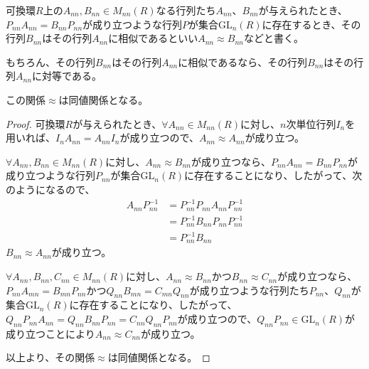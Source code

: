 \documentclass[dvipdfmx]{jsarticle}
\begin{document}
\begin{dfn}
可換環$R$上の$A_{nn},B_{nn} \in M_{nn}(R)$なる行列たち$A_{nn}$、$B_{nn}$が与えられたとき、$P_{nn}A_{nn} = B_{nn}P_{nn}$が成り立つような行列$P$が集合${\mathrm{GL}}_{n}(R)$に存在するとき、その行列$B_{nn}$はその行列$A_{nn}$に相似であるといい$A_{nn} \approx B_{nn}$などと書く。
\end{dfn}\par
もちろん、その行列$B_{nn}$はその行列$A_{nn}$に相似であるなら、その行列$B_{nn}$はその行列$A_{nn}$に対等である。
\begin{thm}\label{2.1.6.2}
この関係$\approx$は同値関係となる。
\end{thm}
\begin{proof}
可換環$R$が与えられたとき、$\forall A_{nn} \in M_{nn}(R)$に対し、$n$次単位行列$I_{n}$を用いれば、$I_{n}A_{nn} = A_{nn}I_{n}$が成り立つので、$A_{nn} \approx A_{nn}$が成り立つ。\par
$\forall A_{nn},B_{nn} \in M_{nn}(R)$に対し、$A_{nn} \approx B_{nn}$が成り立つなら、$P_{nn}A_{nn} = B_{nn}P_{nn}$が成り立つような行列$P_{nn}$が集合${\mathrm{GL}}_{n}(R)$に存在することになり、したがって、次のようになるので、
\begin{align*}
A_{nn}P_{nn}^{- 1} &= P_{nn}^{- 1}P_{nn}A_{nn}P_{nn}^{- 1}\\
&= P_{nn}^{- 1}B_{nn}P_{nn}P_{nn}^{- 1}\\
&= P_{nn}^{- 1}B_{nn}
\end{align*}
$B_{nn} \approx A_{nn}$が成り立つ。\par
$\forall A_{nn},B_{nn},C_{nn} \in M_{nn}(R)$に対し、$A_{nn} \approx B_{nn}$かつ$B_{nn} \approx C_{nn}$が成り立つなら、$P_{nn}A_{mn} = B_{mn}P_{nn}$かつ$Q_{nn}B_{mn} = C_{mn}Q_{nn}$が成り立つような行列たち$P_{nn}$、$Q_{nn}$が集合${\mathrm{GL}}_{n}(R)$に存在することになり、したがって、$Q_{nn}P_{nn}A_{nn} = Q_{nn}B_{nn}P_{nn} = C_{nn}Q_{nn}P_{nn}$が成り立つので、$Q_{nn}P_{nn} \in {\mathrm{GL}}_{n}(R)$が成り立つことにより$A_{nn} \approx C_{nn}$が成り立つ。\par
以上より、その関係$\approx$は同値関係となる。
\end{proof}
\end{document}
